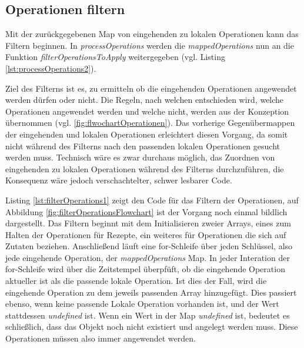 \documentclass[a4paper, 12pt]{scrreprt}
\begin{document}
\begin{minipage}{\linewidth}
	
\end{minipage}

\subsection{Operationen filtern}
\label{sec:filtern}

Mit der zurückgegebenen Map von eingehenden zu lokalen Operationen kann das Filtern beginnen. In \textit{processOperations} werden die \textit{mappedOperations} nun an die Funktion \textit{filterOperationsToApply} weitergegeben (vgl. Listing \ref{lst:processOperations2}).

\begin{minipage}{\linewidth}
	
\end{minipage}

Ziel des Filterns ist es, zu ermitteln ob die eingehenden Operationen angewendet werden dürfen oder nicht. Die Regeln, nach welchen entschieden wird, welche Operationen angewendet werden und welche nicht, werden aus der Konzeption übernommen (vgl. \ref{fig:flwochartOperationen}). Das vorherige Gegenübermappen der eingehenden und lokalen Operationen erleichtert diesen Vorgang, da somit nicht während des Filterns nach den passenden lokalen Operationen gesucht werden muss. Technisch wäre es zwar durchaus möglich, das Zuordnen von eingehenden zu lokalen Operationen während des Filterns durchzuführen, die Konsequenz wäre jedoch verschachtelter, schwer lesbarer Code. 

Listing \ref{lst:filterOperations1} zeigt den Code für das Filtern der Operationen, auf Abbildung \ref{fig:filterOperationsFlowchart} ist der Vorgang noch einmal bildlich dargestellt. Das Filtern beginnt mit dem Initialisieren zweier Arrays, eines zum Halten der Operationen für Rezepte, ein weiteres für Operationen die sich auf Zutaten beziehen. Anschließend läuft eine for-Schleife über jeden Schlüssel, also jede eingehende Operation, der \textit{mappedOperations} Map. In jeder Interation der for-Schleife wird über die Zeitstempel überpfüft, ob die eingehende Operation aktueller ist als die passende lokale Operation. Ist dies der Fall, wird die eingehende Operation zu dem jeweils passenden Array hinzugefügt. Dies passiert ebenso, wenn keine passende Lokale Operation vorhanden ist, und der Wert stattdessen \textit{undefined} ist. Wenn ein Wert in der Map \textit{undefined} ist, bedeutet es schließlich, dass das Objekt noch nicht existiert und angelegt werden muss. Diese Operationen müssen also immer angewendet werden. 
\end{document}
